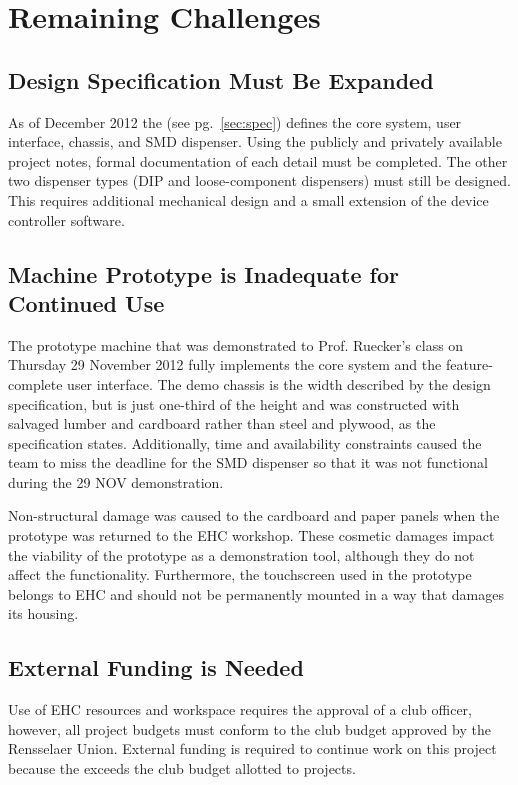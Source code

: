 \documentclass[12pt,oneside,final]{article}
\begin{document}
\pagebreak
\section{Remaining Challenges}
\label{sec:challenges}

\subsection{Design Specification Must Be Expanded}
As of December 2012 the  (see pg.~\ref{sec:spec}) defines the core system, user interface, chassis, and SMD dispenser. Using the publicly and privately available project notes, formal documentation of each detail must be completed. The other two dispenser types (DIP and loose-component dispensers) must still be designed. This requires additional mechanical design and a small extension of the device controller software.

\subsection{Machine Prototype is Inadequate for Continued Use}
The prototype machine that was demonstrated to Prof. Ruecker's class on Thursday 29 November 2012 fully implements the core system and the feature-complete user interface. The demo chassis is the width described by the design specification, but is just one-third of the height and was constructed with salvaged lumber and cardboard rather than steel and plywood, as the specification states. Additionally, time and availability constraints caused the team to miss the deadline for the SMD dispenser so that it was not functional during the 29 NOV demonstration.

Non-structural damage was caused to the cardboard and paper panels when the prototype was returned to the EHC workshop. These cosmetic damages impact the viability of the prototype as a demonstration tool, although they do not affect the functionality. Furthermore, the touchscreen used in the prototype belongs to EHC and should not be permanently mounted in a way that damages its housing.

\subsection{External Funding is Needed}
Use of EHC resources and workspace requires the approval of a club officer, however, all project budgets must conform to the club budget approved by the Rensselaer Union. External funding is required to continue work on this project because the  exceeds the club budget allotted to projects.
\end{document}
